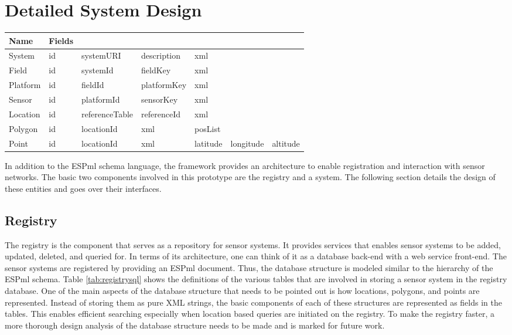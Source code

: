 \section{Detailed System Design}
\begin{table*}
  \begin{center}
  \begin{tabular}{|l|llllll|}
    \hline
    \textbf{Name} & \textbf{Fields} & & & & &\\ \hline \hline
    System & id & systemURI & description & xml & & \\
    Field & id & systemId & fieldKey & xml & & \\
    Platform & id & fieldId & platformKey & xml & &\\
    Sensor & id & platformId & sensorKey & xml & &\\
    Location & id & referenceTable & referenceId & xml & & \\
    Polygon & id & locationId & xml & posList & &\\
    Point & id & locationId & xml & latitude & longitude & altitude \\
    \hline
  \end{tabular}
  \end{center}
  \caption{SQL Table Definitions for Registry Entries}
  \label{tab:registrysql} \end{table*} In addition to the ESPml schema language, the framework provides an architecture to
enable registration and interaction with sensor networks.  The basic two components involved in this prototype are the registry
and a system.  The following section details the design of these entities and goes over their interfaces.  

\subsection{Registry} 
The registry is the component that serves as a repository for sensor systems.  It provides services that
enables sensor systems to be added, updated, deleted, and queried for.  In terms of its architecture, one can think of it as a
database back-end with a web service front-end.  The sensor systems are registered by providing an ESPml document.  Thus, the
database structure is modeled similar to the hierarchy of the ESPml schema.  Table \ref{tab:registrysql} shows the definitions
of the various tables that are involved in storing a sensor system in the registry database.  One of the main aspects of the
database structure that needs to be pointed out is how locations, polygons, and points are represented.  Instead of storing them
as pure XML strings, the basic components of each of these structures are represented as fields in the tables.  This enables
efficient searching especially when location based queries are initiated on the registry.  To make the registry faster, a more
thorough design analysis of the database structure needs to be made and is marked for future work.

